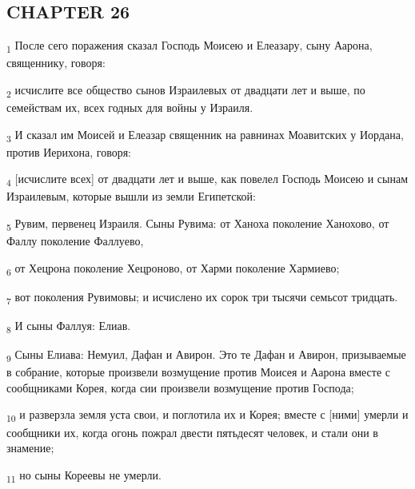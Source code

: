 \subsection{CHAPTER 26}
\begin{tcolorbox}
\textsubscript{1} После сего поражения сказал Господь Моисею и Елеазару, сыну Аарона, священнику, говоря:
\end{tcolorbox}
\begin{tcolorbox}
\textsubscript{2} исчислите все общество сынов Израилевых от двадцати лет и выше, по семействам их, всех годных для войны у Израиля.
\end{tcolorbox}
\begin{tcolorbox}
\textsubscript{3} И сказал им Моисей и Елеазар священник на равнинах Моавитских у Иордана, против Иерихона, говоря:
\end{tcolorbox}
\begin{tcolorbox}
\textsubscript{4} [исчислите всех] от двадцати лет и выше, как повелел Господь Моисею и сынам Израилевым, которые вышли из земли Египетской:
\end{tcolorbox}
\begin{tcolorbox}
\textsubscript{5} Рувим, первенец Израиля. Сыны Рувима: от Ханоха поколение Ханохово, от Фаллу поколение Фаллуево,
\end{tcolorbox}
\begin{tcolorbox}
\textsubscript{6} от Хецрона поколение Хецроново, от Харми поколение Хармиево;
\end{tcolorbox}
\begin{tcolorbox}
\textsubscript{7} вот поколения Рувимовы; и исчислено их сорок три тысячи семьсот тридцать.
\end{tcolorbox}
\begin{tcolorbox}
\textsubscript{8} И сыны Фаллуя: Елиав.
\end{tcolorbox}
\begin{tcolorbox}
\textsubscript{9} Сыны Елиава: Немуил, Дафан и Авирон. Это те Дафан и Авирон, призываемые в собрание, которые произвели возмущение против Моисея и Аарона вместе с сообщниками Корея, когда сии произвели возмущение против Господа;
\end{tcolorbox}
\begin{tcolorbox}
\textsubscript{10} и разверзла земля уста свои, и поглотила их и Корея; вместе с [ними] умерли и сообщники их, когда огонь пожрал двести пятьдесят человек, и стали они в знамение;
\end{tcolorbox}
\begin{tcolorbox}
\textsubscript{11} но сыны Кореевы не умерли.
\end{tcolorbox}
